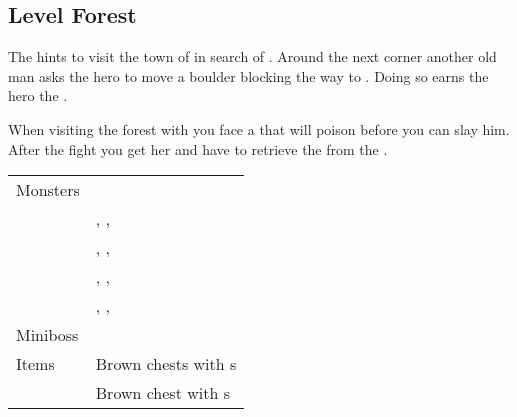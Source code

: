 \subsection{Level Forest}
\label{map:level_forest}

The  hints to visit the town of  in search of . Around the next corner another old man asks the hero to move a boulder blocking the way to . Doing so earns the hero the . 

When visiting the forest with  you face a  that will poison  before you can slay him. After the fight you get her  and have to retrieve the  from the .

\begin{longtable}{ l p{9cm} }
	Monsters\\
	\nameref{monster:brownie}
	& \nameref{monster:brownie}, \nameref{monster:brownie}, \nameref{monster:slime} \\
	& \nameref{monster:brownie}, \nameref{monster:brownie}, \nameref{monster:brownie} \\
	\nameref{monster:slime}
	& \nameref{monster:slime}, \nameref{monster:slime}, \nameref{monster:slime} \\
	& \nameref{monster:slime}, \nameref{monster:slime}, \nameref{monster:brownie}
\\
	Miniboss & \nameref{monster:minotaur}
\\
	Items
	& Brown chests with \nameref{item:cure_potion}s \\
	& Brown chest with \nameref{item:heal_potion}s
\end{longtable}

